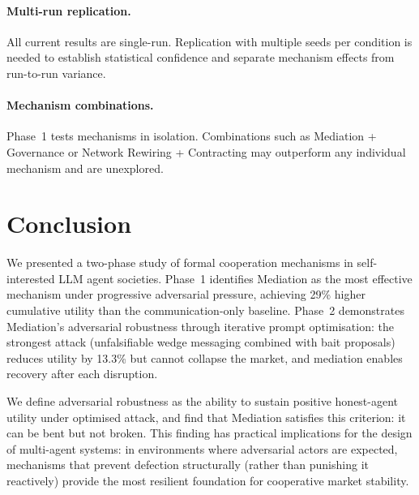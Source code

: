 \documentclass{article}
\begin{document}
\paragraph{Multi-run replication.} All current results are single-run. Replication with multiple seeds per condition is needed to establish statistical confidence and separate mechanism effects from run-to-run variance.

\paragraph{Mechanism combinations.} Phase~1 tests mechanisms in isolation. Combinations such as Mediation + Governance or Network Rewiring + Contracting may outperform any individual mechanism and are unexplored.

\section{Conclusion}
\label{sec:conclusion}

We presented a two-phase study of formal cooperation mechanisms in self-interested LLM agent societies. Phase~1 identifies Mediation as the most effective mechanism under progressive adversarial pressure, achieving 29\% higher cumulative utility than the communication-only baseline. Phase~2 demonstrates Mediation's adversarial robustness through iterative prompt optimisation: the strongest attack (unfalsifiable wedge messaging combined with bait proposals) reduces utility by 13.3\% but cannot collapse the market, and mediation enables recovery after each disruption.

We define adversarial robustness as the ability to sustain positive honest-agent utility under optimised attack, and find that Mediation satisfies this criterion: it can be bent but not broken. This finding has practical implications for the design of multi-agent systems: in environments where adversarial actors are expected, mechanisms that prevent defection structurally (rather than punishing it reactively) provide the most resilient foundation for cooperative market stability.

\end{document}
